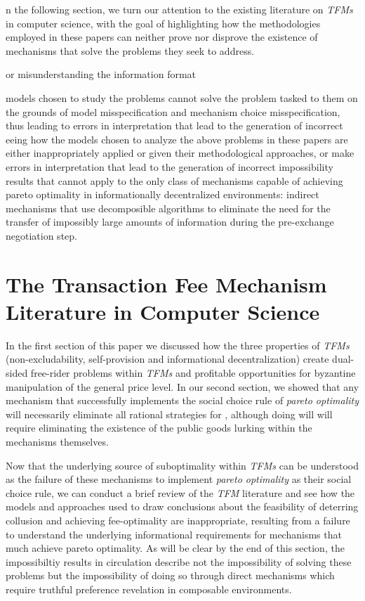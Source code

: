 \documentclass[sigconf,anonymous]{aamas}
\begin{document}
n the following section, we turn our attention to the existing literature on \textit{TFMs} in computer science, with the goal of highlighting how the methodologies employed in these papers can neither prove nor disprove the existence of mechanisms that solve the problems they seek to address. 





 or misunderstanding the information format

models chosen to study the problems cannot solve the problem tasked to them on the grounds of model misspecification and mechanism choice misspecification, thus leading to errors in interpretation that lead to the generation of incorrect eeing how the models chosen to analyze the above problems in these papers are either inappropriately applied or given their methodological approaches, or make errors in interpretation that lead to the generation of incorrect impossibility results that cannot apply to the only class of mechanisms capable of achieving pareto optimality in informationally decentralized environments: indirect mechanisms that use decomposible algorithms to eliminate the need for the transfer of impossibly large amounts of information during the pre-exchange negotiation step.


\section{The Transaction Fee Mechanism Literature in Computer Science\label{sec::section1p2}}

In the first section of this paper we discussed how the three properties of \textit{TFMs} (non-excludability, self-provision and informational decentralization) create dual-sided free-rider problems within \textit{TFMs} and profitable opportunities for byzantine manipulation of the general price level. In our second section, we showed that any mechanism that successfully implements the social choice rule of \textit{pareto optimality} will necessarily eliminate all rational strategies for , although doing will will require eliminating the existence of the public goods lurking within the mechanisms themselves.

Now that the underlying source of suboptimality within \textit{TFMs} can be understood as the failure of these mechanisms to implement \textit{pareto optimality} as their social choice rule, we can conduct a brief review of the \textit{TFM} literature and see how the models and approaches used to draw conclusions about the feasibility of deterring collusion and achieving fee-optimality are inappropriate, resulting from a failure to understand the underlying informational requirements for mechanisms that much achieve pareto optimality. As will be clear by the end of this section, the impossibiltiy results in circulation describe not the impossibility of solving these problems but the impossibility of doing so through direct mechanisms which require truthful preference revelation in composable environments.
\end{document}

